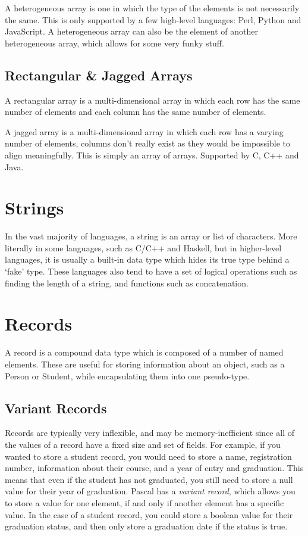 A heterogeneous array is one in which the type of the elements is not necessarily the same. This is only supported by a
 few high-level languages: Perl, Python and JavaScript. A heterogeneous array can also be the element of another
 heterogeneous array, which allows for some very funky stuff.

\subsection*{Rectangular \& Jagged Arrays}

A rectangular array is a multi-dimensional array in which each row has the same number of elements and each column has
 the same number of elements.

A jagged array is a multi-dimensional array in which each row has a varying number of elements, columns don't really
 exist as they would be impossible to align meaningfully. This is simply an array of arrays. Supported by C, C++ and Java.

\section*{Strings}

In the vast majority of languages, a string is an array or list of characters. More literally in some languages, such as
 C/C++ and Haskell, but in higher-level languages, it is usually a built-in data type which hides its true type behind
 a `fake' type. These languages also tend to have a set of logical operations such as finding the length of a string,
 and functions such as concatenation.

\section*{Records}

A record is a compound data type which is composed of a number of named elements. These are useful for storing information
 about an object, such as a Person or Student, while encapsulating them into one pseudo-type.

\subsection*{Variant Records}

Records are typically very inflexible, and may be memory-inefficient since all of the values of a record have a fixed
 size and set of fields. For example, if you wanted to store a student record, you would need to store a name, registration
 number, information about their course, and a year of entry and graduation. This means that even if the student has not
 graduated, you still need to store a null value for their year of graduation. Pascal has a \textit{variant record},
 which allows you to store a value for one element, if and only if another element has a specific value. In the case of
 a student record, you could store a boolean value for their graduation status, and then only store a graduation date if
 the status is true.


